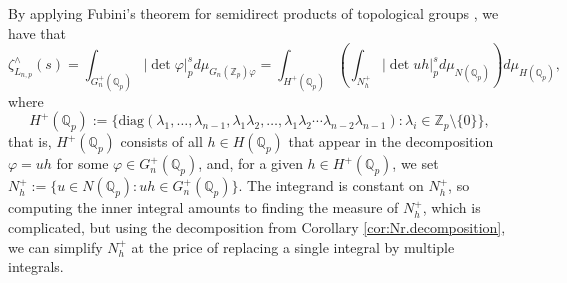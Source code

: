 \documentclass[12pt]{article}
\begin{document}
By applying Fubini's theorem for semidirect products of topological groups \cite[Proposition 28]{Nachbin}, we have that \[\zeta_{L_{n,p}}^{\wedge}(s)=\displaystyle\int_{G_{n}^{+}(\mathbb{Q}_p)}|\det{\varphi}|_p^sd\mu_{G_{n}(\mathbb{Z}_p)\varphi}=\displaystyle\int_{H^+(\mathbb{Q}_p)}\left(\displaystyle\int_{N_{h}^+}|\det{uh}|_p^sd\mu_{N(\mathbb{Q}_p)}\right)d\mu_{H(\mathbb{Q}_p)},\]
where \[H^+(\mathbb{Q}_p):=\{\mathrm{diag}(\lambda_{1},\dots,\lambda_{n-1},\lambda_{1}\lambda_{2},\dots,\lambda_{1}\lambda_{2}\cdots\lambda_{n-2}\lambda_{n-1}) : \lambda_{i}\in\mathbb{Z}_{p}\setminus\{0\}\},\]
that is, $H^+(\mathbb{Q}_p)$ consists of all $h\in{H(\mathbb{Q}_{p})}$ that appear in the decomposition $\varphi=uh$ for some $\varphi\in{G_{n}^{+}(\mathbb{Q}_{p})}$, and, for a given $h\in{H^{+}(\mathbb{Q}_{p})}$, we set $N_{h}^{+}:=\{u\in{N(\mathbb{Q}_{p}) : uh\in{G_{n}^{+}(\mathbb{Q}_{p})}}\}$. The integrand is constant on $N_{h}^{+}$, so computing the inner integral amounts to finding the measure of $N_{h}^+$, which is complicated, but using the decomposition from Corollary \ref{cor:Nr.decomposition}, we can simplify $N_{h}^{+}$ at the price of replacing a single integral by multiple integrals.
\end{document}
